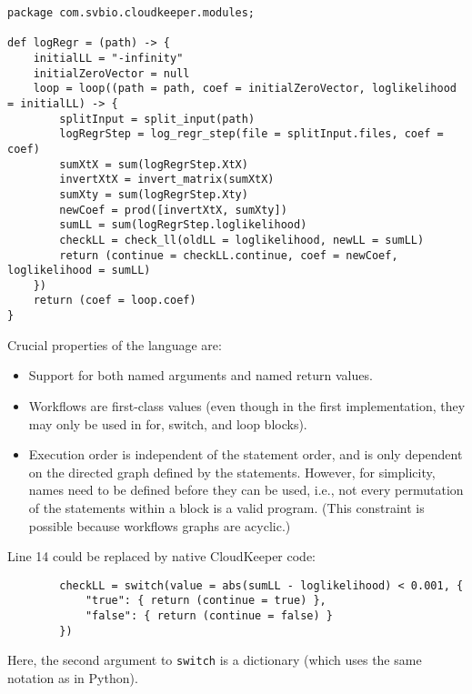 \begin{lstlisting}
package com.svbio.cloudkeeper.modules;

def logRegr = (path) -> {
    initialLL = "-infinity"
    initialZeroVector = null
    loop = loop((path = path, coef = initialZeroVector, loglikelihood = initialLL) -> {
        splitInput = split_input(path)
        logRegrStep = log_regr_step(file = splitInput.files, coef = coef)
        sumXtX = sum(logRegrStep.XtX)
        invertXtX = invert_matrix(sumXtX)
        sumXty = sum(logRegrStep.Xty)
        newCoef = prod([invertXtX, sumXty])
        sumLL = sum(logRegrStep.loglikelihood)
        checkLL = check_ll(oldLL = loglikelihood, newLL = sumLL)
        return (continue = checkLL.continue, coef = newCoef, loglikelihood = sumLL)
    })
    return (coef = loop.coef)
}
\end{lstlisting}

Crucial properties of the language are:
\begin{itemize}
	\item Support for both named arguments and named return values.
	\item Workflows are first-class values (even though in the first implementation, they may only be used in for, switch, and loop blocks).
	\item Execution order is independent of the statement order, and is only dependent on the directed graph defined by the statements. However, for simplicity, names need to be defined before they can be used, i.e., not every permutation of the statements within a block is a valid program. (This constraint is possible because workflows graphs are acyclic.)
\end{itemize}

Line 14 could be replaced by native CloudKeeper code:
\begin{lstlisting}
        checkLL = switch(value = abs(sumLL - loglikelihood) < 0.001, {
            "true": { return (continue = true) },
            "false": { return (continue = false) }
        })
\end{lstlisting}
Here, the second argument to \texttt{switch} is a dictionary (which uses the same notation as in Python).
